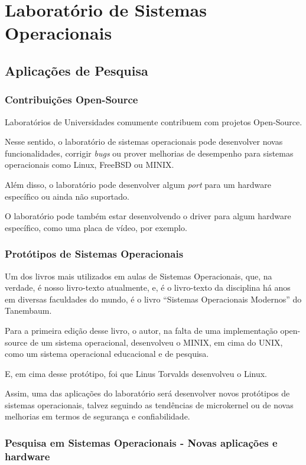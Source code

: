 \section{Laboratório de Sistemas Operacionais}

\subsection{Aplicações de Pesquisa}

\subsubsection{Contribuições Open\--Source}

Laboratórios de Universidades comumente contribuem com projetos
Open\--Source.

Nesse sentido, o laboratório de sistemas operacionais pode desenvolver novas funcionalidades, corrigir \textit{bugs} ou prover melhorias de desempenho para sistemas operacionais como Linux, FreeBSD ou MINIX.

Além disso, o laboratório pode desenvolver algum \textit{port} para um
hardware específico ou ainda não suportado.

O laboratório pode também estar desenvolvendo o driver para
algum hardware específico, como uma placa de vídeo, por exemplo.

\subsubsection{Protótipos de Sistemas Operacionais}

Um dos livros mais utilizados em aulas de Sistemas Operacionais, que,
na verdade, é nosso livro\--texto atualmente, e, é o livro\--texto
da disciplina há anos em diversas faculdades do mundo, é o livro
``Sistemas Operacionais Modernos'' do Tanembaum.

Para a primeira edição desse livro, o autor, na falta de uma implementação
open\--source de um sistema operacional, desenvolveu o MINIX, em cima
do UNIX, como um sistema operacional educacional e de pesquisa.

E, em cima desse protótipo, foi que Linus Torvalds desenvolveu o Linux.

Assim, uma das aplicações do laboratório será desenvolver novos protótipos
de sistemas operacionais, talvez seguindo as tendências de microkernel
ou de novas melhorias em termos de segurança e confiabilidade.

\subsubsection{Pesquisa em Sistemas Operacionais \-- Novas aplicações e hardware}


